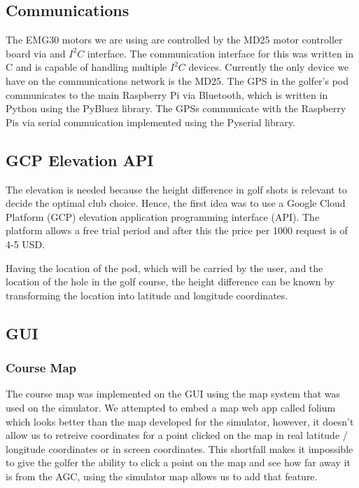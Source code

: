 \documentclass[11pt,landscape]{article}
\begin{document}
\begin{multicols}{3}

\subsection{Communications}
The EMG30 motors we are using are controlled by the MD25 motor controller board
via and $I^2C$ interface. The communication interface for this was written in C
and is capable of handling multiple $I^2C$ devices. Currently the only device we
have on the communications network is the MD25. The GPS in the golfer's pod communicates to the main Raspberry Pi via Bluetooth,
which is written in Python using the PyBluez library. The GPSs communicate with
the Raspberry Pis via serial commuication implemented using the Pyserial
library.

\subsection{GCP Elevation API}
The elevation is needed because the height difference in golf shots is relevant
to decide the optimal club choice. Hence, the first idea was to use a Google
Cloud Platform (GCP) elevation application programming interface (API). The
platform allows a free trial period and after this the price per 1000 request is
of 4-5 USD. 

Having the location of the pod, which will be carried by the user, and the
location of the hole in the golf course, the height difference can be known by
transforming the location into latitude and longitude coordinates.


\subsection{GUI}
\subsubsection{Course Map}
The course map was implemented on the GUI using the map system that was used on
the simulator. We attempted to embed a map web app called folium which looks
better than the map developed for the simulator, however, it doesn't allow us to
retreive coordinates for a point clicked on the map in real latitude / longitude
coordinates or in screen coordinates. This shortfall makes it impossible to give
the golfer the ability to click a point on the map and see how far away it is
from the AGC, using the simulator map allows us to add that feature.


\end{multicols}
\end{document}

